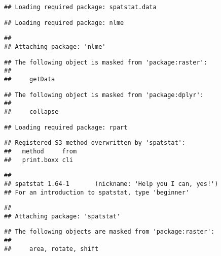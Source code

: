 \documentclass[
  xelatex,ja=standard]{bxjsarticle}
\begin{document}
\begin{verbatim}
## Loading required package: spatstat.data
\end{verbatim}

\begin{verbatim}
## Loading required package: nlme
\end{verbatim}

\begin{verbatim}
## 
## Attaching package: 'nlme'
\end{verbatim}

\begin{verbatim}
## The following object is masked from 'package:raster':
## 
##     getData
\end{verbatim}

\begin{verbatim}
## The following object is masked from 'package:dplyr':
## 
##     collapse
\end{verbatim}

\begin{verbatim}
## Loading required package: rpart
\end{verbatim}

\begin{verbatim}
## Registered S3 method overwritten by 'spatstat':
##   method     from
##   print.boxx cli
\end{verbatim}

\begin{verbatim}
## 
## spatstat 1.64-1       (nickname: 'Help you I can, yes!') 
## For an introduction to spatstat, type 'beginner'
\end{verbatim}

\begin{verbatim}
## 
## Attaching package: 'spatstat'
\end{verbatim}

\begin{verbatim}
## The following objects are masked from 'package:raster':
## 
##     area, rotate, shift
\end{verbatim}
\end{document}
